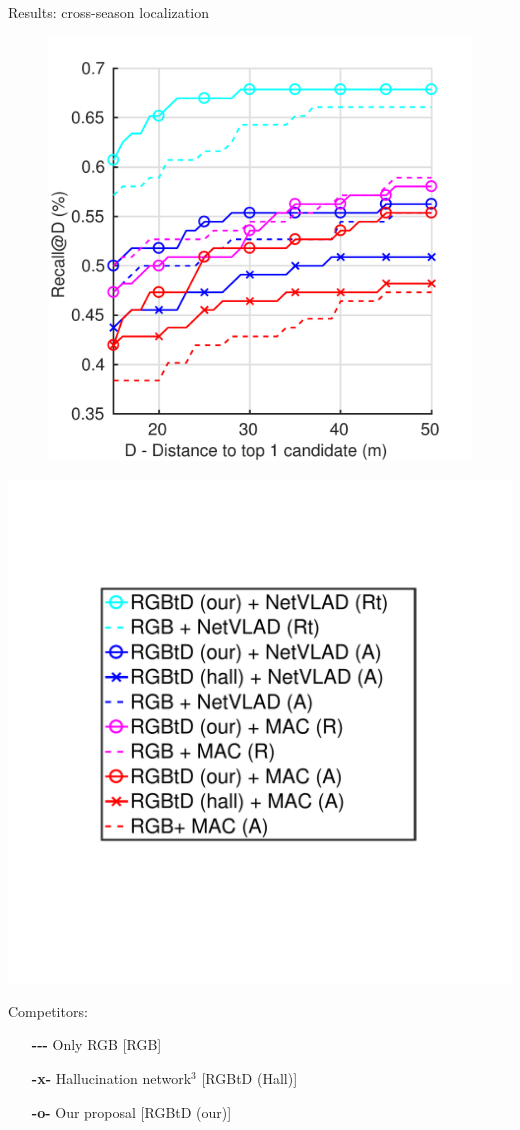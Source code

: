 \begin{frame}{Results: cross-season localization}
	\begin{minipage}{0.49\linewidth}
		\centering
		\begin{figure}
			\includegraphics[width=0.9\linewidth]{vect/res/snow}
		\end{figure}
	\end{minipage}\hfill
	\begin{minipage}{0.49\linewidth}
		\includegraphics[trim={90 140 95 100},clip,width=0.5\linewidth]{vect/res/legend}		
		\vspace{0.5cm}		
				
		Competitors:
		\begin{itemize}
			\item[\textbf{-{}-{}-}] Only RGB [RGB]
			\item[\textbf{-x-}] Hallucination network$^3$ [RGBtD (Hall)]
			\item[\textbf{-o-}] Our proposal [RGBtD (our)]
		\end{itemize}
	\end{minipage}
	\textcolor{white}{}
\end{frame}

